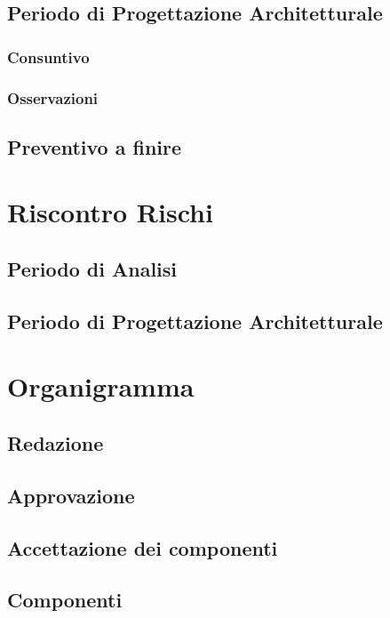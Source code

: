 \documentclass[a4paper, oneside, openany, dvipsnames, table]{article}
\begin{document}
	\subsection{Periodo di Progettazione Architetturale}
	
	\subsubsection{Consuntivo}
		
	\subsubsection{Osservazioni}
		
	\subsection{Preventivo a finire}
		
		
\appendix
{}

\newpage
\section{Riscontro Rischi}
	\label{app:riscontro}
	
	\subsection{Periodo di Analisi}
			
	\subsection{Periodo di Progettazione Architetturale}
	

\newpage
\section{Organigramma}
	\subsection{Redazione}
		
	\subsection{Approvazione}
		
	\subsection{Accettazione dei componenti}
			
	\subsection{Componenti}
		
\end{document}
